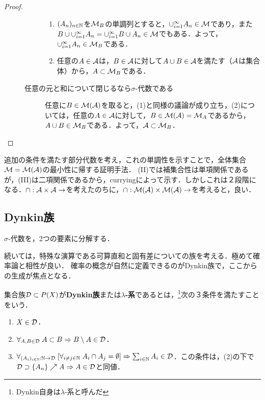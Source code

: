 \documentclass[uplatex, dvipdfmx]{jsreport}
\begin{document}
\begin{proof}
\begin{description}
\begin{description}
\begin{enumerate}
                    \item $(A_n)_{n\in\mathbb{N}}$を$\mathcal{M}_B$の単調列とすると，$\cup_{i=1}^\infty A_n\in\mathcal{M}$であり，また$B\cup\cup_{i=1}^\infty A_n=\cup_{i=1}^\infty B\cup A_n\in\mathcal{M}$でもある．よって，$\cup_{i=1}^\infty A_n\in\mathcal{M}_B$である．
                    \item 任意の$A\in\mathcal{A}$は，$B\in\mathcal{A}$に対して$A\cup B\in\mathcal{A}$を満たす（$\mathcal{A}$は集合体）から，$A\subset\mathcal{M}_B$である．
                \end{enumerate}
                \item[任意の元と和について閉じるなら$\sigma$-代数である] 
                任意に$B\in\mathcal{M}(\mathcal{A})$を取ると，(1)と同様の議論が成り立ち，(2)については，任意の$A\in\mathcal{A}$に対して，$B\in \mathcal{M}(\mathcal{A})=\mathcal{M}_A$であるから，$A\cup B\in\mathcal{M}_B$である．よって，$\mathcal{A}\subset\mathcal{M}_B$．
            \end{description}
    \end{description}
\end{proof}
\begin{remarks}
    追加の条件を満たす部分代数を考え，これの単調性を示すことで，全体集合$\mathcal{M}=\mathcal{M}(\mathcal{A})$の最小性に帰する証明手法．
    (II)では補集合性は単項関係であるが，(III)は二項関係であるから，curryingによって示す．しかしこれは２段階になる．$\cap:\mathcal{A}\times\mathcal{A}\to$を考えたのちに，$\cap:\mathcal{M}(\mathcal{A})\times\mathcal{M}(\mathcal{A})\to$を考えると，良い．
\end{remarks}

\subsection{Dynkin族}

\begin{tcolorbox}[colframe=ForestGreen, colback=ForestGreen!10!white,breakable,colbacktitle=ForestGreen!40!white,coltitle=black,fonttitle=\bfseries\sffamily,
title=]
    $\sigma$-代数を，2つの要素に分解する．

    続いては，特殊な演算である可算直和と固有差についての族を考える．極めて確率論と相性が良い．
    確率の概念が自然に定義できるのがDynkin族で，ここからの生成が焦点となる．
\end{tcolorbox}

\begin{definition}
    集合族$\mathcal{D}\subset P(X)$が\textbf{Dynkin族}または\textbf{$\lambda$-系}であるとは，\footnote{Dynkin自身は$\lambda$-系と呼んだ}次の３条件を満たすことをいう．
    \begin{enumerate}
        \item $X\in\mathcal{D}$．
        \item $\forall_{A,B\in\mathcal{D}}\;A\subset B\Rightarrow B\setminus A\in\mathcal{D}$．
        \item $\forall_{(A_i)_{i\in\mathbb{N}}:\mathbb{N}\to\mathcal{D}}\;[\forall_{i\ne j\in\mathbb{N}}\;A_i\cap A_j=\emptyset]\Rightarrow \sum_{i\in\mathbb{N}}A_i\in\mathcal{D}$．この条件は，(2)の下で$\mathcal{D}\supset\{A_n\}\nearrow A\Rightarrow A\in\mathcal{D}$と同値．
    \end{enumerate}
\end{definition}
\end{document}
